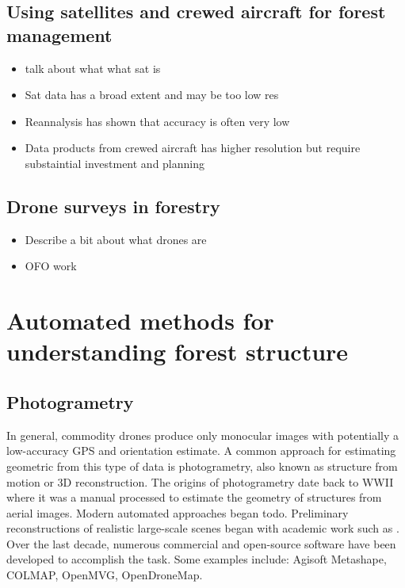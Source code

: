 \subsection{Using satellites and crewed aircraft for forest management}
\begin{itemize}
    \item talk about what what sat is 
    \item Sat data has a broad extent and may be too low res
    \item Reannalysis has shown that accuracy is often very low \cite{} 
    \item Data products from crewed aircraft has higher resolution but require substaintial investment and planning
\end{itemize}

\subsection{Drone surveys in forestry}
\begin{itemize}
    \item Describe a bit about what drones are  
    \item OFO work \cite{Young2022} 
\end{itemize}

\section{Automated methods for understanding forest structure}
\subsection{Photogrametry}
In general, commodity drones produce only monocular images with potentially a low-accuracy GPS and orientation estimate. A common approach for estimating geometric from this type of data is photogrametry, also known as structure from motion or 3D reconstruction. The origins of photogrametry date back to WWII where it was a manual processed to estimate the geometry of structures from aerial images. Modern automated approaches began todo. Preliminary reconstructions of realistic large-scale scenes began with academic work such as \cite{Agarwal2009}. Over the last decade, numerous commercial and open-source software have been developed to accomplish the task. Some examples include: Agisoft Metashape, COLMAP, OpenMVG, OpenDroneMap.


